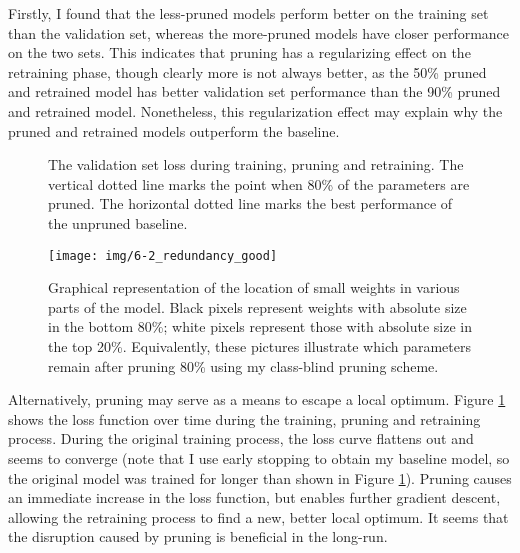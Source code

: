 Firstly, I found that the less-pruned models perform better on the training set than the validation set, whereas the more-pruned models have closer performance on the two sets. 
This indicates that pruning has a regularizing effect on the retraining phase, though clearly more is not always better, as the 50\% pruned and retrained model has better validation set performance than the 90\% pruned and retrained model.
Nonetheless, this regularization effect may explain why the pruned and retrained models outperform the baseline.
\begin{figure}[tbh]
\centering

\caption[Validation set losses during training, pruning and retraining]{The validation set loss during training, pruning and retraining. The vertical dotted line marks the point when 80\% of the parameters are pruned. The horizontal dotted line marks the best performance of the unpruned baseline.}

\label{fig:loss_curve}
\end{figure}

\begin{figure*}
\centering
\texttt{[image: img/6-2\_redundancy\_good]} %
\caption[Graphical representation of the location of small weights]{Graphical representation of the location of small weights in various parts of the model. 
Black pixels represent weights with absolute size in the bottom 80\%; white pixels represent those with absolute size in the top 20\%.
Equivalently, these pictures illustrate which parameters remain after pruning 80\% using my class-blind pruning scheme.
}
\label{fig:redundancy_location}
\end{figure*}



Alternatively, pruning may serve as a means to escape a local optimum. 
Figure \ref{fig:loss_curve} shows the loss function over time during the training, pruning and retraining process.
During the original training process, the loss curve flattens out and seems to converge (note that I use early stopping to obtain my baseline model, so the original model was trained for longer than shown in Figure \ref{fig:loss_curve}).
Pruning causes an immediate increase in the loss function, but enables further gradient descent, allowing the retraining process to find a new, better local optimum.
It seems that the disruption caused by pruning is beneficial in the long-run.

